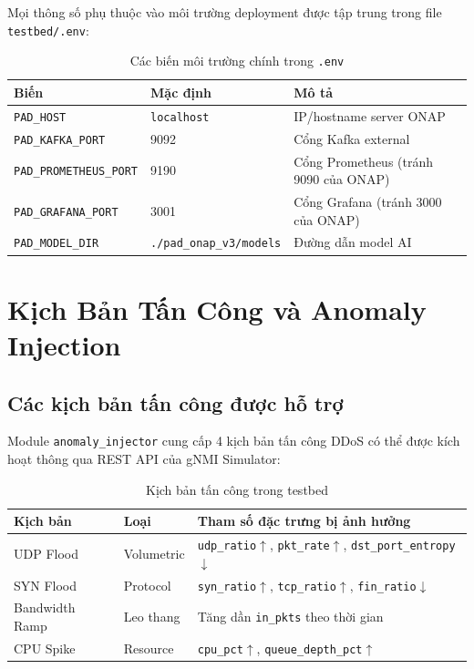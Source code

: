 \documentclass[12pt,a4paper]{article}
\begin{document}
Mọi thông số phụ thuộc vào môi trường deployment được tập trung trong file \texttt{testbed/.env}:

\begin{table}[H]
\centering
\caption{Các biến môi trường chính trong \texttt{.env}}
\label{tab:env}
\begin{tabular}{llp{6cm}}
\toprule
\textbf{Biến} & \textbf{Mặc định} & \textbf{Mô tả} \\
\midrule
\texttt{PAD\_HOST}              & \texttt{localhost} & IP/hostname server ONAP \\
\texttt{PAD\_KAFKA\_PORT}       & 9092 & Cổng Kafka external \\
\texttt{PAD\_PROMETHEUS\_PORT}  & 9190 & Cổng Prometheus (tránh 9090 của ONAP) \\
\texttt{PAD\_GRAFANA\_PORT}     & 3001 & Cổng Grafana (tránh 3000 của ONAP) \\
\texttt{PAD\_MODEL\_DIR}        & \texttt{./pad\_onap\_v3/models} & Đường dẫn model AI \\
\bottomrule
\end{tabular}
\end{table}

\section{Kịch Bản Tấn Công và Anomaly Injection}

\subsection{Các kịch bản tấn công được hỗ trợ}

Module \texttt{anomaly\_injector} cung cấp 4 kịch bản tấn công DDoS có thể được kích hoạt thông qua REST API của gNMI Simulator:

\begin{table}[H]
\centering
\caption{Kịch bản tấn công trong testbed}
\label{tab:attacks}
\begin{tabular}{llp{8cm}}
\toprule
\textbf{Kịch bản} & \textbf{Loại} & \textbf{Tham số đặc trưng bị ảnh hưởng} \\
\midrule
UDP Flood       & Volumetric  & \texttt{udp\_ratio}$\uparrow$, \texttt{pkt\_rate}$\uparrow$, \texttt{dst\_port\_entropy}$\downarrow$ \\
SYN Flood       & Protocol    & \texttt{syn\_ratio}$\uparrow$, \texttt{tcp\_ratio}$\uparrow$, \texttt{fin\_ratio}$\downarrow$ \\
Bandwidth Ramp  & Leo thang   & Tăng dần \texttt{in\_pkts} theo thời gian \\
CPU Spike       & Resource    & \texttt{cpu\_pct}$\uparrow$, \texttt{queue\_depth\_pct}$\uparrow$ \\
\bottomrule
\end{tabular}
\end{table}
\end{document}
